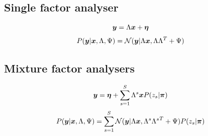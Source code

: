 \documentclass[a4paper]{article}
\begin{document}
\subsection{Single factor analyser}
\begin{align}
  \boldsymbol{y}=\Lambda\boldsymbol{x}+\boldsymbol{\eta}
\end{align}
\begin{align}
  P(\boldsymbol{y}|\boldsymbol{x},\Lambda,\Psi)=\mathcal{N}(\boldsymbol{y}|\Lambda\boldsymbol{x},\Lambda\Lambda^T+\Psi)
\end{align}

\subsection{Mixture factor analysers}
\begin{align}
  \boldsymbol{y}=\boldsymbol{\eta}+\sum_{s=1}^S\Lambda^s\boldsymbol{x} P(z_s|\boldsymbol{\pi})
\end{align}
\begin{align}
  P(\boldsymbol{y}|\boldsymbol{x},\Lambda,\Psi)=\sum_{s=1}^S\mathcal{N}(\boldsymbol{y}|\Lambda\boldsymbol{x},\Lambda^s{\Lambda^s}^T+\Psi)P(z_s|\boldsymbol{\pi})
\end{align}

\newpage
\end{document}
